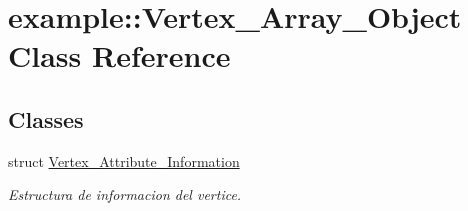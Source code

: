 \hypertarget{classexample_1_1_vertex___array___object}{}\section{example\+::Vertex\+\_\+\+Array\+\_\+\+Object Class Reference}
\label{classexample_1_1_vertex___array___object}
\subsection*{Classes}
\begin{DoxyCompactItemize}
\item 
struct \mbox{\hyperlink{structexample_1_1_vertex___array___object_1_1_vertex___attribute___information}{Vertex\+\_\+\+Attribute\+\_\+\+Information}}
\begin{DoxyCompactList}\small\item\em Estructura de informacion del vertice. \end{DoxyCompactList}\end{DoxyCompactItemize}
